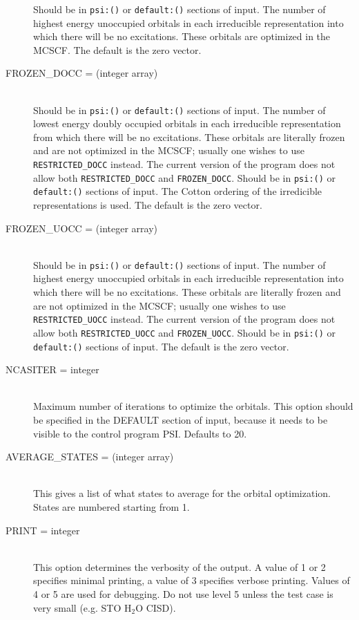 \begin{description}
Should be in {\tt psi:()} or {\tt default:()} sections of input.
The number of highest energy unoccupied orbitals in each irreducible
representation into which there will be no excitations.
These orbitals are optimized in the MCSCF.
The default is the zero vector.
\item[FROZEN\_DOCC = (integer array)]\mbox{}\\
Should be in {\tt psi:()} or {\tt default:()} sections of input.
The number of lowest energy doubly occupied orbitals in each irreducible
representation from which there will be no excitations.  
These orbitals are literally frozen and are not optimized in the MCSCF;
usually one wishes to use {\tt RESTRICTED\_DOCC} instead.
The current version of the program does not allow both
{\tt RESTRICTED\_DOCC} and {\tt FROZEN\_DOCC}.
Should be in {\tt psi:()} or {\tt default:()} sections of input.
The Cotton ordering of the irredicible representations is used.
The default is the zero vector.
\item[FROZEN\_UOCC = (integer array)]\mbox{}\\
Should be in {\tt psi:()} or {\tt default:()} sections of input.
The number of highest energy unoccupied orbitals in each irreducible
representation into which there will be no excitations.
These orbitals are literally frozen and are not optimized in the MCSCF;
usually one wishes to use {\tt RESTRICTED\_UOCC} instead.
The current version of the program does not allow both
{\tt RESTRICTED\_UOCC} and {\tt FROZEN\_UOCC}.
Should be in {\tt psi:()} or {\tt default:()} sections of input.
The default is the zero vector.
\item[NCASITER = integer]\mbox{}\\
Maximum number of iterations to optimize the orbitals.  This option
should be specified in the DEFAULT section of input, because
it needs to be visible to the control program PSI.  Defaults to 20.
\item[AVERAGE\_STATES = (integer array)]\mbox{}\\
This gives a list of what states to average for the orbital 
optimization.  States are numbered starting from 1.
\item[PRINT = integer]\mbox{}\\
This option determines the verbosity of the output.  A value of 1 or
2 specifies minimal printing, a value of 3 specifies verbose printing.
Values of 4 or 5 are used for debugging.  Do not use level 5 unless
the test case is very small (e.g. STO H$_2$O CISD).
\end{description}

